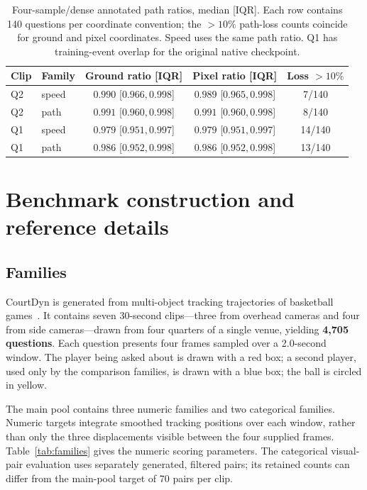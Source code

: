 \documentclass[11pt]{article}
\begin{document}
\begin{table}[t]
\centering\small
\setlength{\tabcolsep}{3pt}
\caption{Four-sample/dense annotated path ratios, median [IQR]. Each row
contains 140 questions per coordinate convention; the $>10\%$ path-loss
counts coincide for ground and pixel coordinates. Speed uses the same path
ratio. Q1 has training-event overlap for the original native checkpoint.}
\label{tab:four_sample_trajectory}
\begin{tabular}{llccc}
\toprule
Clip & Family & Ground ratio [IQR] & Pixel ratio [IQR] & Loss $>10\%$ \\
\midrule
Q2 & speed & $0.990$ [$0.966, 0.998$] & $0.989$ [$0.965, 0.998$] & 7/140 \\
Q2 & path & $0.991$ [$0.960, 0.998$] & $0.991$ [$0.960, 0.998$] & 8/140 \\
Q1 & speed & $0.979$ [$0.951, 0.997$] & $0.979$ [$0.951, 0.997$] & 14/140 \\
Q1 & path & $0.986$ [$0.952, 0.998$] & $0.986$ [$0.952, 0.998$] & 13/140 \\
\bottomrule
\end{tabular}
\end{table}

\section{Benchmark construction and reference details}
\label{supp:benchmark}

\subsection{Families}

CourtDyn is generated from multi-object tracking trajectories of basketball
games~\cite{teamtrack2024}. It contains seven 30-second clips---three from
overhead cameras and four from side cameras---drawn from four quarters of a
single venue, yielding \textbf{4{,}705 questions}. Each question presents four
frames sampled over a 2.0-second window. The player being asked about is drawn
with a red box; a second player, used only by the comparison families, is drawn
with a blue box; the ball is circled in yellow.

The main pool contains three numeric families and two categorical families.
Numeric targets integrate smoothed tracking positions over each window, rather
than only the three displacements visible between the four supplied frames.
Table~\ref{tab:families} gives the numeric scoring parameters. The categorical
visual-pair evaluation uses separately generated, filtered pairs; its retained
counts can differ from the main-pool target of 70 pairs per clip.
\end{document}
